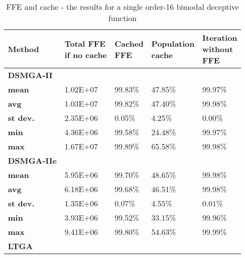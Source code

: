 \begin{table}[]
	\centering
	\caption{FFE and cache - the results for a single order-16 bimodal deceptive function}
	\label{tab:ImmediateStuckBimod16}
	\begin{tabular}{lllll}
		\toprule
		\textbf{Method} & \pbox{20cm}{\textbf{Total FFE}\\\textbf{if no cache}} & \pbox{20cm}{\textbf{Cached}\\\textbf{FFE}} & \pbox{20cm}{\textbf{Population}\\\textbf{cache}} & \pbox{20cm}{\textbf{Iteration}\\\textbf{without}\\\textbf{FFE}}  \\ 
		
		\midrule
		\textbf{DSMGA-II} & & & & \\
		\textbf{mean}                  & 1.02E+07      & 99.83\%             & 47.85\%                         & 99.97\% \\
		\textbf{avg}                   & 1.03E+07      & 99.82\%             & 47.40\%                         & 99.98\% \\
		\textbf{st dev.}               & 2.35E+06      & 0.05\%              & 4.25\%                          & 0.00\%  \\
		\textbf{min}                   & 4.36E+06      & 99.58\%             & 24.48\%                         & 99.97\% \\
		\textbf{max}                   & 1.67E+07      & 99.89\%             & 65.58\%                         & 99.98\% \\
		\midrule
		\textbf{DSMGA-IIe} & & & & \\
		\textbf{mean}                  & 5.95E+06      & 99.70\%             & 48.65\%                         & 99.98\% \\
		\textbf{avg}                   & 6.18E+06      & 99.68\%             & 46.51\%                         & 99.98\% \\
		\textbf{st dev.}               & 1.35E+06      & 0.07\%              & 4.55\%                          & 0.01\%  \\
		\textbf{min}                   & 3.93E+06      & 99.52\%             & 33.15\%                         & 99.96\% \\
		\textbf{max}                   & 9.41E+06      & 99.80\%             & 54.63\%                         & 99.99\% \\
		\midrule
		\textbf{LTGA} & & & & \\

\end{tabular}
\end{table}
